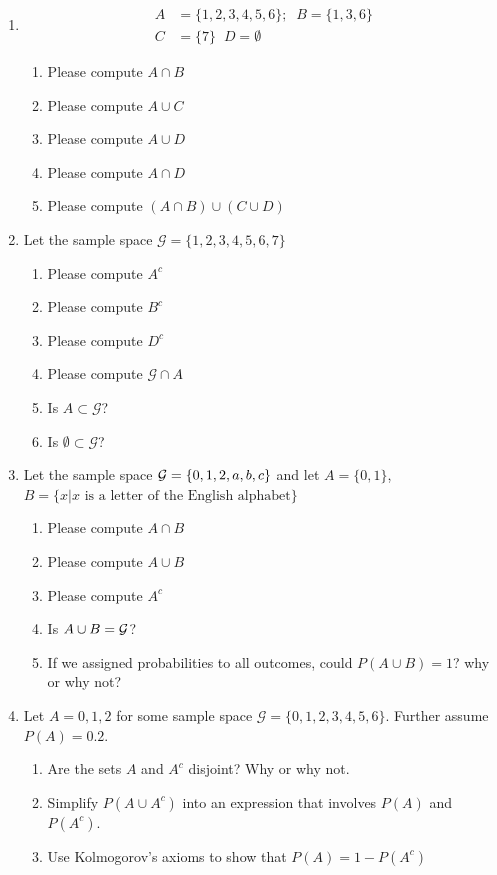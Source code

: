 \begin{enumerate}
    \item \begin{align*}
              A &= \{1,2,3,4,5,6\};
              \;\;B = \{1,3,6\} \\
              C &= \{7\}  
              \;\;D = \emptyset
           \end{align*}
    \begin{enumerate}
        \item Please compute $A \cap B$
        \item Please compute $A \cup C$
        \item Please compute $A \cup D$
        \item Please compute $A \cap D$
        \item Please compute $(A \cap B) \cup (C \cup D)$
    \end{enumerate}
    \item Let the sample space $\mathcal{G} = \{ 1,2,3,4,5,6,7 \}$
    \begin{enumerate}
       \item Please compute $A^{c}$
       \item Please compute $B^{c}$
       \item Please compute $D^{c}$
       \item Please compute $\mathcal{G} \cap A$
       \item Is $A \subset \mathcal{G}$?
       \item Is $\emptyset \subset \mathcal{G}$?
    \end{enumerate}
    
    \item Let the sample space $\mathcal{G} = \{0,1,2,a,b,c\}$ and let $A=\{0,1\}$, $B=\{x | x\text{ is a letter of the English alphabet}\}$
    \begin{enumerate}
        \item Please compute $A \cap B$
        \item Please compute $A \cup B$
        \item Please compute $A^{c}$
        \item Is $A \cup B = \mathcal{G}$?
        \item If we assigned probabilities to all outcomes, could $P(A \cup B) = 1$? why or why not?
    \end{enumerate}
    
    \item Let $A = {0,1,2}$ for some sample space $\mathcal{G} = \{0,1,2,3,4,5,6\}$. Further assume $P(A) = 0.2$. 
    \begin{enumerate}
        \item Are the sets $A$ and $A^{c}$ disjoint? Why or why not.
        \item Simplify $P(A \cup A^{c})$ into an expression that involves $P(A)$ and $P(A^{c})$.
        \item Use Kolmogorov's axioms to show that $P(A) = 1 - P(A^{c})$ 
    \end{enumerate}
    

\end{enumerate}
